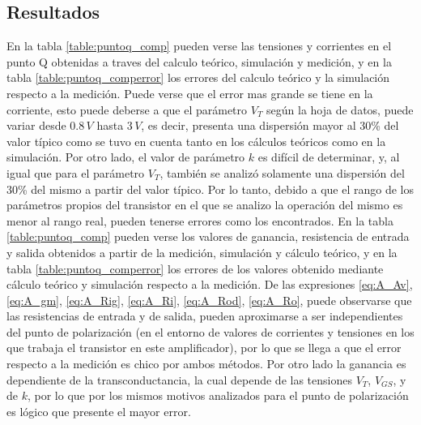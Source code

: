 \documentclass[10pt,spanish,a4paper,notitlepage]{article}
\begin{document}
\subsection{Resultados}

En la tabla  \ref{table:puntoq_comp} pueden verse las tensiones y corrientes en el
punto Q obtenidas a traves del calculo teórico, simulación y medición, y en la tabla
\ref{table:puntoq_comperror} los errores del calculo teórico y la simulación respecto
a la medición. Puede verse que el error mas grande se tiene en la corriente, esto
puede deberse a que el parámetro $V_{T}$ según la hoja de datos, puede variar desde
$0.8\,\unit{V}$ hasta $3\,\unit{V}$, es decir, presenta una dispersión mayor al 30\%
del valor típico como se tuvo en cuenta tanto en los cálculos teóricos como en la
simulación. Por otro lado, el valor de parámetro $k$ es difícil de determinar, y, al
igual que para el parámetro $V_{T}$, también se analizó solamente una dispersión del
30\% del mismo a partir del valor típico. Por lo tanto, debido a que el rango de los
parámetros propios del transistor en el que se analizo la operación del mismo es menor al rango
real, pueden tenerse errores como los encontrados. En la tabla
\ref{table:puntoq_comp} pueden verse los valores de ganancia, resistencia de entrada
y salida obtenidos a partir de la medición, simulación y cálculo teórico, y en la
tabla \ref{table:puntoq_comperror} los errores de los valores obtenido mediante
cálculo teórico y simulación respecto a la medición. De las expresiones
\ref{eq:A_Av}, \ref{eq:A_gm}, \ref{eq:A_Rig}, \ref{eq:A_Ri}, \ref{eq:A_Rod},
\ref{eq:A_Ro}, puede observarse que las resistencias de entrada y de salida, pueden
aproximarse a ser independientes del punto de polarización (en el entorno de valores de corrientes y tensiones en los que trabaja el transistor en este amplificador), por lo que se llega a que el error respecto a
la medición es chico por ambos métodos. Por otro lado la ganancia es dependiente de
la transconductancia, la cual depende de las tensiones $V_{T}$, $V_{GS}$, y de $k$, por lo que
por los mismos motivos analizados para el punto de polarización es lógico que
presente el mayor error.
\end{document}

